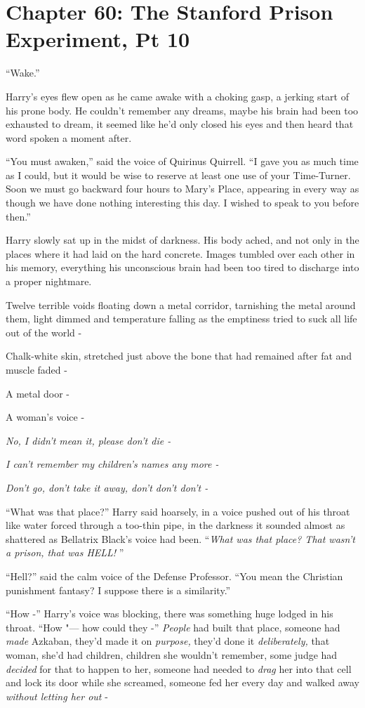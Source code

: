 \chapter{Chapter 60: The Stanford Prison Experiment, Pt 10}
``Wake.''

Harry's eyes flew open as he came awake with a choking gasp, a jerking
start of his prone body. He couldn't remember any dreams, maybe his
brain had been too exhausted to dream, it seemed like he'd only closed
his eyes and then heard that word spoken a moment after.

``You must awaken,'' said the voice of Quirinus Quirrell. ``I gave you
as much time as I could, but it would be wise to reserve at least one
use of your Time-Turner. Soon we must go backward four hours to Mary's
Place, appearing in every way as though we have done nothing interesting
this day. I wished to speak to you before then.''

Harry slowly sat up in the midst of darkness. His body ached, and not
only in the places where it had laid on the hard concrete. Images
tumbled over each other in his memory, everything his unconscious brain
had been too tired to discharge into a proper nightmare.

Twelve terrible voids floating down a metal corridor, tarnishing the
metal around them, light dimmed and temperature falling as the emptiness
tried to suck all life out of the world -

Chalk-white skin, stretched just above the bone that had remained after
fat and muscle faded -

A metal door -

A woman's voice -

\emph{No, I didn't mean it, please don't die -}

\emph{I can't remember my children's names any more -}

\emph{Don't go, don't take it away, don't don't don't -}

``What was that place?'' Harry said hoarsely, in a voice pushed out of
his throat like water forced through a too-thin pipe, in the darkness it
sounded almost as shattered as Bellatrix Black's voice had been.
``\emph{What was that place? That wasn't a prison, that was HELL!} ''

``Hell?'' said the calm voice of the Defense Professor. ``You mean the
Christian punishment fantasy? I suppose there is a similarity.''

``How -'' Harry's voice was blocking, there was something huge lodged in
his throat. ``How "--- how could they -'' \emph{People} had built that
place, someone had \emph{made} Azkaban, they'd made it on
\emph{purpose,} they'd done it \emph{deliberately,} that woman, she'd
had children, children she wouldn't remember, some judge had
\emph{decided} for that to happen to her, someone had needed to
\emph{drag} her into that cell and lock its door while she screamed,
someone fed her every day and walked away \emph{without letting her out}
-

